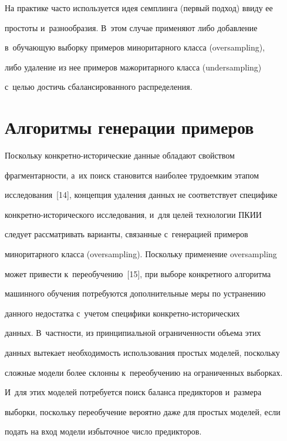   


  На практике часто используется идея семплинга (первый подход) ввиду ее 


простоты и~разнообразия. В~этом случае применяют либо добавление 


в~обуча\-ющую выборку примеров миноритарного класса (oversampling), 


либо удаление из нее примеров мажоритарного класса (undersampling) 


с~\mbox{целью} достичь сбалансированного распределения.


  


\section{Алгоритмы генерации примеров}





  Поскольку конкретно-исторические данные обладают свойством 


фрагментарности, а~их поиск становится наиболее трудоемким этапом 


исследования~[14], концепция удаления данных не соответствует специфике 


кон\-крет\-но-ис\-то\-ри\-че\-ско\-го исследования, и~для целей технологии ПКИИ 


следует рассматривать варианты, связанные с~генерацией примеров 


миноритарного класса (oversampling). Поскольку применение oversampling 


может привести к~переобучению~[15], при выборе конкретного алгоритма 


машинного обучения потребуются дополнительные меры по устранению 


данного недостатка с~учетом специфики кон\-крет\-но-ис\-то\-ри\-че\-ских 


данных. В~част\-ности, из принципиальной ограниченности объема этих 


данных вытекает необходимость использования простых моделей, поскольку 


сложные модели более склонны к~переобучению на ограниченных выборках. 


И~для этих моделей потребуется поиск баланса предикторов и~размера 


выборки, поскольку переобучение вероятно даже для простых моделей, если 


подать на вход модели избыточное число предикторов.


